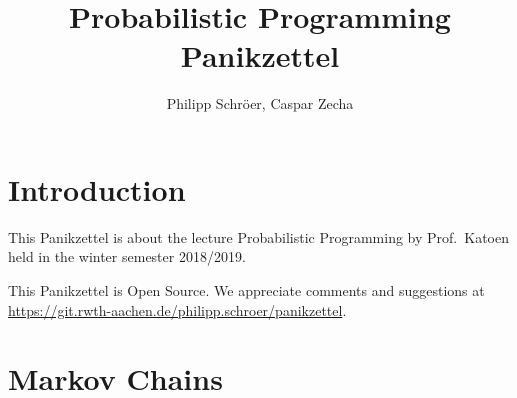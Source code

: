 \documentclass[english]{panikzettel}
\title{Probabilistic Programming Panikzettel}
\author{Philipp Schröer, Caspar Zecha}
\begin{document}
\maketitle

\setcounter{tocdepth}{2}
\tableofcontents

\newpage
\section{Introduction}

This Panikzettel is about the lecture Probabilistic Programming by Prof.\ Katoen held in the winter semester 2018/2019.

This Panikzettel is Open Source. We appreciate comments and suggestions at \\ \url{https://git.rwth-aachen.de/philipp.schroer/panikzettel}.

\section{Markov Chains}
\end{document}
